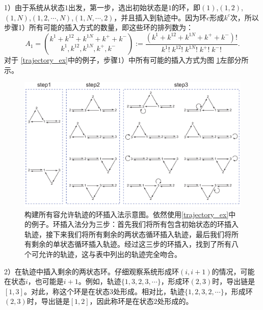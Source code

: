 1）由于系统从状态$1$出发，第一步，选出初始状态是$1$的环，即$(1)$,$(1,2)$,$(1,N)$,$(1,2,\cdots,N)$,$(1,N,\cdots,2)$，并且插入到轨迹中。因为环$c$形成$k^c$次，所以步骤1）所有可能的插入方式的数量，即这些环的排列数为：
\begin{equation*}\label{formula:A1}
    A_1 = \binom{k^1+k^{12}+k^{1N}+k^{+}+k^{-}}{k^1,k^{12},k^{1N},k^{+},k^{-}}
    := \frac{(k^1+k^{12}+k^{1N}+k^{+}+k^{-})!}{k^1!\;k^{12}!\;k^{1N}!\;k^{+}!\;k^{-}!}.
\end{equation*}
对于 \ref{trajectory_ex}中的例子，步骤1）中所有可能的插入方式为图 \ref{figure:insertion}左部分所示。
\begin{figure}[htb!]
\centering
\includegraphics[scale=0.6]{chart/insertiongraph.pdf}
\caption{构建所有容允许轨迹的环插入法示意图。依然使用\ref{trajectory_ex}中的例子。环插入法分为三步：首先我们将所有包含初始状态的环插入轨迹，接下来我们将所有剩余的两状态循环插入轨迹，最后我们将所有剩余的单状态循环插入轨迹。经过这三步的环插入，找到了所有八个可允许的轨迹，这与表中列出的轨迹完全吻合。}
\label{figure:insertion}
\end{figure}

2）在轨迹中插入剩余的两状态环。仔细观察系统形成环$(i,i+1)$的情况，可能在状态$i$，也可能是$i+1$。例如，轨迹$\{1, 3, 2, 3, \cdots\}$，形成环$(2,3)$时，导出链是$[1, 3]$。对此，称这个环是在状态$3$处形成。相对比，轨迹$\{1,2,3,2, \cdots\}$，形成环$(2,3)$时，导出链是$[1, 2]$，因此称环是在状态$2$处形成的。

